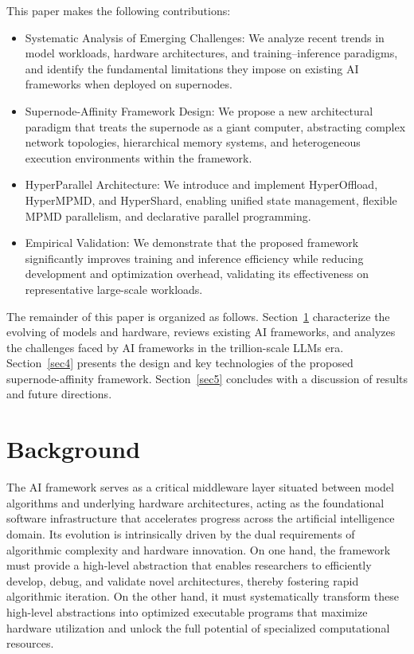 \documentclass[11pt]{article}
\begin{document}
This paper makes the following contributions:
\begin{itemize}
    \item Systematic Analysis of Emerging Challenges: We analyze recent trends in model workloads, hardware architectures, and training–inference paradigms, and identify the fundamental limitations they impose on existing AI frameworks when deployed on supernodes.
    \item Supernode-Affinity Framework Design: We propose a new architectural paradigm that treats the supernode as a giant computer, abstracting complex network topologies, hierarchical memory systems, and heterogeneous execution environments within the framework.
    \item HyperParallel Architecture: We introduce and implement HyperOffload, HyperMPMD, and HyperShard, enabling unified state management, flexible MPMD parallelism, and declarative parallel programming.
    \item Empirical Validation: We demonstrate that the proposed framework significantly improves training and inference efficiency while reducing development and optimization overhead, validating its effectiveness on representative large-scale workloads.
\end{itemize}


The remainder of this paper is organized as follows. Section~\ref{sec2} characterize the evolving of models and hardware, reviews existing AI frameworks, and analyzes the challenges faced by AI frameworks in the trillion-scale LLMs era. Section~\ref{sec4} presents the design and key technologies of the proposed supernode-affinity framework. Section~\ref{sec5} concludes with a discussion of results and future directions.





\section{Background}
\label{sec2}


The AI framework serves as a critical middleware layer situated between model algorithms and underlying hardware architectures, acting as the foundational software infrastructure that accelerates progress across the artificial intelligence domain. Its evolution is intrinsically driven by the dual requirements of algorithmic complexity and hardware innovation. On one hand, the framework must provide a high-level abstraction that enables researchers to efficiently develop, debug, and validate novel architectures, thereby fostering rapid algorithmic iteration. On the other hand, it must systematically transform these high-level abstractions into optimized executable programs that maximize hardware utilization and unlock the full potential of specialized computational resources.
\end{document}
